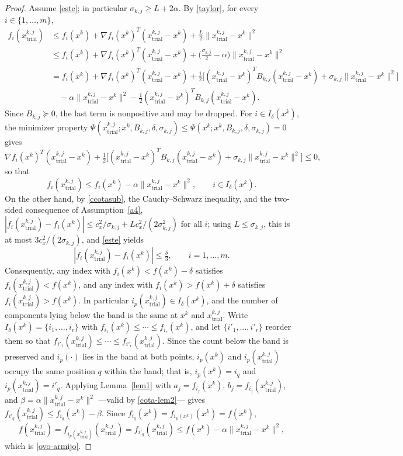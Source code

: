 \documentclass[11pt]{article}
\newcommand{\xkjtrial}{x^{k,j}_{\mathrm{trial}}}
\begin{document}
\begin{proof}
Assume \eqref{este}; in particular $\sigma_{k,j} \geq L + 2\alpha$. By
\eqref{taylor}, for every $i \in \{1, \ldots, m\}$,
\begin{align*}
f_i(\xkjtrial)
&\leq f_i(x^k) + \nabla f_i(x^k)^T(\xkjtrial - x^k)
+ \tfrac{L}{2}\|\xkjtrial - x^k\|^2 \\
&\leq f_i(x^k) + \nabla f_i(x^k)^T(\xkjtrial - x^k)
+ \Big( \tfrac{\sigma_{k,j}}{2} - \alpha \Big) \|\xkjtrial - x^k\|^2 \\
&= f_i(x^k) + \nabla f_i(x^k)^T(\xkjtrial - x^k)
+ \tfrac{1}{2} \big[ (\xkjtrial - x^k)^T B_{k,j} (\xkjtrial - x^k)
+ \sigma_{k,j}\|\xkjtrial - x^k\|^2 \big] \\
&\quad - \alpha \|\xkjtrial - x^k\|^2
- \tfrac{1}{2}(\xkjtrial - x^k)^T B_{k,j} (\xkjtrial - x^k).
\end{align*}
Since $B_{k,j} \succeq 0$, the last term is nonpositive and may be dropped. For
$i \in I_\delta(x^k)$, the minimizer property
$\Psi(\xkjtrial; x^k, B_{k,j}, \delta, \sigma_{k,j}) \leq
\Psi(x^k; x^k, B_{k,j}, \delta, \sigma_{k,j}) = 0$ gives
\[
\nabla f_i(x^k)^T(\xkjtrial - x^k)
+ \tfrac{1}{2} \big[ (\xkjtrial - x^k)^T B_{k,j} (\xkjtrial - x^k)
+ \sigma_{k,j}\|\xkjtrial - x^k\|^2 \big] \leq 0,
\]
so that
\begin{equation} \label{cota-lem2}
f_i(\xkjtrial) \leq f_i(x^k) - \alpha \|\xkjtrial - x^k\|^2, \qquad
i \in I_\delta(x^k).
\end{equation}
On the other hand, by \eqref{ccotasub}, the Cauchy--Schwarz inequality, and the
two-sided consequence of Assumption~\ref{a4},
$|f_i(\xkjtrial) - f_i(x^k)| \leq c_x^2/\sigma_{k,j}
+ L c_x^2/(2\sigma_{k,j}^2)$ for all $i$; using $L \leq \sigma_{k,j}$, this is
at most $3c_x^2/(2\sigma_{k,j})$, and \eqref{este} yields
\begin{equation} \label{teo7eq1}
|f_i(\xkjtrial) - f_i(x^k)| \leq \tfrac{\delta}{3}, \qquad i = 1, \ldots, m.
\end{equation}
Consequently, any index with $f_i(x^k) < f(x^k) - \delta$ satisfies
$f_i(\xkjtrial) < f(x^k)$, and any index with $f_i(x^k) > f(x^k) + \delta$
satisfies $f_i(\xkjtrial) > f(x^k)$. In particular $i_p(\xkjtrial) \in
I_\delta(x^k)$, and the number of components lying below the band is the same at
$x^k$ and $\xkjtrial$. Write $I_\delta(x^k) = \{i_1, \ldots, i_r\}$ with
$f_{i_1}(x^k) \leq \cdots \leq f_{i_r}(x^k)$, and let
$\{i'_1, \ldots, i'_r\}$ reorder them so that
$f_{i'_1}(\xkjtrial) \leq \cdots \leq f_{i'_r}(\xkjtrial)$. Since the count below
the band is preserved and $i_p(\cdot)$ lies in the band at both points,
$i_p(x^k)$ and $i_p(\xkjtrial)$ occupy the same position $q$ within the band;
that is, $i_p(x^k) = i_q$ and $i_p(\xkjtrial) = i'_q$. Applying
Lemma~\ref{lem1} with $a_j = f_{i_j}(x^k)$, $b_j = f_{i_j}(\xkjtrial)$, and
$\beta = \alpha\|\xkjtrial - x^k\|^2$ ---valid by \eqref{cota-lem2}--- gives
$f_{i'_q}(\xkjtrial) \leq f_{i_q}(x^k) - \beta$. Since
$f_{i_q}(x^k) = f_{i_p(x^k)}(x^k) = f(x^k)$,
\[
f(\xkjtrial) = f_{i_p(\xkjtrial)}(\xkjtrial) = f_{i'_q}(\xkjtrial)
\leq f(x^k) - \alpha \|\xkjtrial - x^k\|^2,
\]
which is \eqref{ovo-armijo}.
\end{proof}
\end{document}
